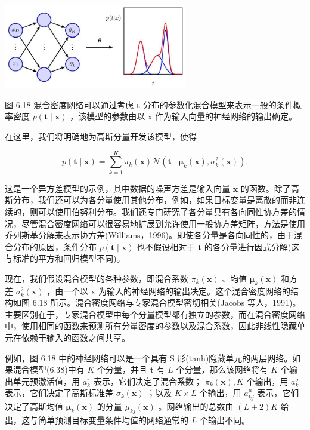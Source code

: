 \documentclass[10pt]{article}
\begin{document}
\begin{center}
\includegraphics[max width=0.6\textwidth]{images/0194e279-9b28-703a-88f4-c3ac21e2010d_219_722_356_823_379_0.jpg}
\end{center}
\hspace*{3em} 

图 6.18 混合密度网络可以通过考虑 \(\mathbf{t}\) 分布的参数化混合模型来表示一般的条件概率密度 \(p\left( {\mathbf{t} \mid  \mathbf{x}}\right)\) ，该模型的参数由以 \(\mathrm{x}\) 作为输入向量的神经网络的输出确定。

在这里，我们将明确地为高斯分量开发该模型，使得

\[
p\left( {\mathbf{t} \mid  \mathbf{x}}\right)  = \mathop{\sum }\limits_{{k = 1}}^{K}{\pi }_{k}\left( \mathbf{x}\right) \mathcal{N}\left( {\mathbf{t} \mid  {\mathbf{\mu }}_{k}\left( \mathbf{x}\right) ,{\sigma }_{k}^{2}\left( \mathbf{x}\right) }\right) . \tag{6.38}
\]

这是一个异方差模型的示例，其中数据的噪声方差是输入向量 \(\mathbf{x}\) 的函数。除了高斯分布，我们还可以为各分量使用其他分布，例如，如果目标变量是离散的而非连续的，则可以使用伯努利分布。我们还专门研究了各分量具有各向同性协方差的情况，尽管混合密度网络可以很容易地扩展到允许使用一般协方差矩阵，方法是使用乔列斯基分解来表示协方差(Williams，1996)。即使各分量是各向同性的，由于混合分布的原因，条件分布 \(p\left( {\mathbf{t} \mid  \mathbf{x}}\right)\) 也不假设相对于 \(\mathbf{t}\) 的各分量进行因式分解(这与标准的平方和回归模型不同)。

现在，我们假设混合模型的各种参数，即混合系数 \({\pi }_{k}\left( \mathbf{x}\right)\) 、均值 \({\mathbf{\mu }}_{k}\left( \mathbf{x}\right)\) 和方差 \({\sigma }_{k}^{2}\left( \mathbf{x}\right)\) ，由一个以 \(\mathrm{x}\) 为输入的神经网络的输出决定。这个混合密度网络的结构如图 6.18 所示。混合密度网络与专家混合模型密切相关(Jacobs 等人，1991)。主要区别在于，专家混合模型中每个分量模型都有独立的参数，而在混合密度网络中，使用相同的函数来预测所有分量密度的参数以及混合系数，因此非线性隐藏单元在依赖于输入的函数之间共享。

例如，图 6.18 中的神经网络可以是一个具有 S 形(tanh)隐藏单元的两层网络。如果混合模型(6.38)中有 \(K\) 个分量，并且 \(\mathbf{t}\) 有 \(L\) 个分量，那么该网络将有 \(K\) 个输出单元预激活值，用 \({a}_{k}^{\pi }\) 表示，它们决定了混合系数； \({\pi }_{k}\left( \mathbf{x}\right) ,K\) 个输出，用 \({a}_{k}^{\sigma }\) 表示，它们决定了高斯标准差 \({\sigma }_{k}\left( \mathbf{x}\right)\) ；以及 \(K \times  L\) 个输出，用 \({a}_{kj}^{\mu }\) 表示，它们决定了高斯均值 \({\mathbf{\mu }}_{k}\left( \mathbf{x}\right)\) 的分量 \({\mu }_{kj}\left( \mathbf{x}\right)\) 。网络输出的总数由 \(\left( {L + 2}\right) K\) 给出，这与简单预测目标变量条件均值的网络通常的 \(L\) 个输出不同。
\end{document}
